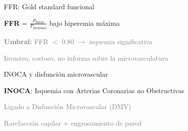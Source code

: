 \documentclass[aspectratio=169, 11pt]{beamer}
\begin{document}
\begin{frame}{FFR: Gold standard funcional}

  \centering
  \vfill
  \textbf{FFR} = $\displaystyle\frac{P_{\text{distal}}}{P_{\text{proximal}}}$ \quad bajo hiperemia máxima

  \vspace{0.5cm}
  \textcolor{gray}{\small \textbf{Umbral:} FFR $<$ 0.80 $\rightarrow$ isquemia significativa}

  \vspace{0.5cm}
  \textcolor{gray}{\small Invasivo, costoso, no informa sobre la microvasculatura}
  \vfill
\end{frame}

\begin{frame}{INOCA y disfunción microvascular}

  \centering
  \vfill
  \textbf{INOCA}: Isquemia con Arterias Coronarias no Obstructivas

  \vspace{0.3cm}
  \textcolor{gray}{\small Ligado a Disfunción Microvascular (DMV)}

  \vspace{0.5cm}
  \textcolor{gray}{\small Rarefacción capilar + engrosamiento de pared}
  \vfill
\end{frame}

\end{document}
